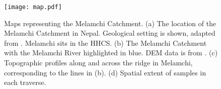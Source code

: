 \FloatBarrier

\begin{figure}[h]
    \centering
    \texttt{[image: map.pdf]}
    \caption{Maps representing the Melamchi Catchment. (a) The location of the Melamchi Catchment in Nepal. Geological setting is shown, adapted from \cite{dhitalGeologyNepalHimalaya2015}. Melamchi sits in the HHCS. (b) The Melamchi Catchment with the Melamchi River highlighted in blue. DEM data is from \cite{asterGlobalDigitalElevation2018}. (c) Topographic profiles along and across the ridge in Melamchi, corresponding to the lines in (b). (d) Spatial extent of samples in each traverse.}
    \label{fig:map}
\end{figure}

\FloatBarrier















